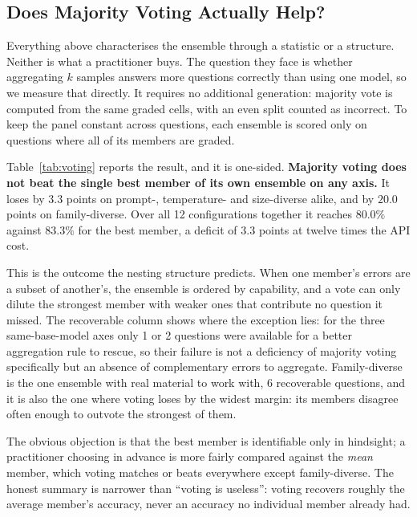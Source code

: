 \documentclass[conference]{IEEEtran}
\begin{document}
\FloatBarrier

\subsection{Does Majority Voting Actually Help?}
\label{sec:voting}
Everything above characterises the ensemble through a statistic or a
structure. Neither is what a practitioner buys. The question they face is
whether aggregating $k$ samples answers more questions correctly than using
one model, so we measure that directly. It requires no additional
generation: majority vote is computed from the same graded cells, with an
even split counted as incorrect. To keep the panel constant across
questions, each ensemble is scored only on questions where all of its
members are graded.

Table~\ref{tab:voting} reports the result, and it is one-sided.
\textbf{Majority voting does not beat the single best member of its own
ensemble on any axis.} It loses by $3.3$ points on prompt-, temperature- and
size-diverse alike, and by $20.0$ points on family-diverse. Over all 12
configurations together it reaches $80.0\%$ against $83.3\%$ for the best
member, a deficit of $3.3$ points at twelve times the API cost.

This is the outcome the nesting structure predicts. When one member's errors
are a subset of another's, the ensemble is ordered by capability, and a vote
can only dilute the strongest member with weaker ones that contribute no
question it missed. The recoverable column shows where the exception lies:
for the three same-base-model axes only 1 or 2 questions were available for a
better aggregation rule to rescue, so their failure is not a deficiency of
majority voting specifically but an absence of complementary errors to
aggregate. Family-diverse is the one ensemble with real material to work
with, 6 recoverable questions, and it is also the one where voting loses by
the widest margin: its members disagree often enough to outvote the strongest
of them.

The obvious objection is that the best member is identifiable only in
hindsight; a practitioner choosing in advance is more fairly compared against
the \emph{mean} member, which voting matches or beats everywhere except
family-diverse. The honest summary is narrower than ``voting is useless'':
voting recovers roughly the average member's accuracy, never an accuracy no
individual member already had.
\end{document}
